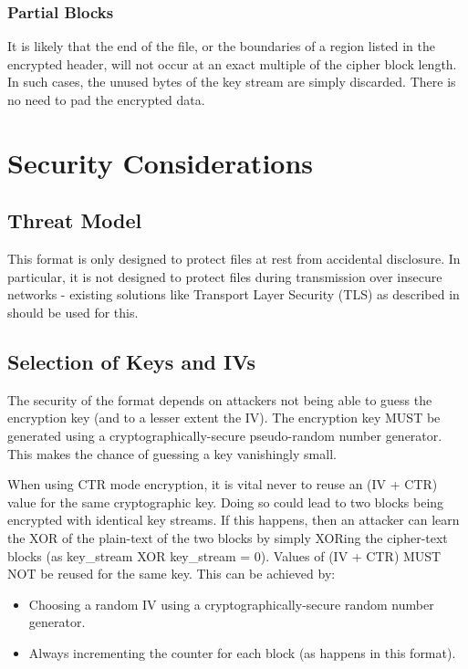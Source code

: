 \documentclass[10pt]{article}
\begin{document}
\subsubsection{Partial Blocks}
It is likely that the end of the file, or the boundaries of a region listed in the encrypted header, will not occur at
an exact multiple of the cipher block length.
In such cases, the unused bytes of the key stream are simply discarded.
There is no need to pad the encrypted data.

\section{Security Considerations}
\subsection{Threat Model}
This format is only designed to protect files at rest from accidental disclosure.
In particular, it is not designed to protect files during transmission over insecure networks - existing solutions like
Transport Layer Security (TLS) as described in \cite{RFC5246} should be used for this.

\subsection{Selection of Keys and IVs}
The security of the format depends on attackers not being able to guess the encryption key (and to a lesser extent the
IV).
The encryption key MUST be generated using a cryptographically-secure pseudo-random number generator.
This makes the chance of guessing a key vanishingly small.

When using CTR mode encryption, it is vital never to reuse an (IV + CTR) value for the same cryptographic key.
Doing so could lead to two blocks being encrypted with identical key streams.
If this happens, then an attacker can learn the XOR of the plain-text of the two blocks by simply XORing the cipher-text
blocks (as key\_stream XOR key\_stream = 0).
Values of (IV + CTR) MUST NOT be reused for the same key.
This can be achieved by:

\begin{itemize}
\item Choosing a random IV using a cryptographically-secure random number generator.
\item Always incrementing the counter for each block (as happens in this format).
\end{itemize}
\end{document}
